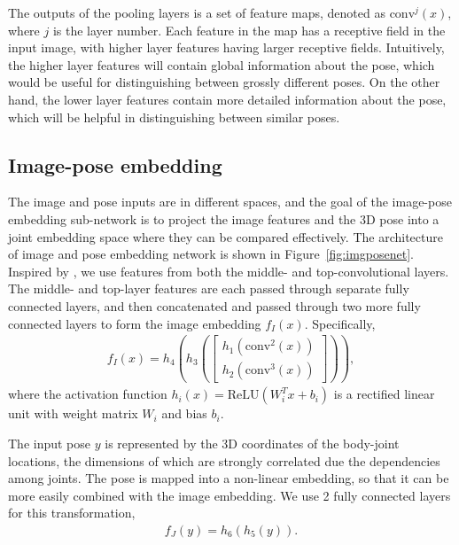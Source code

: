 \documentclass[10pt,twocolumn,letterpaper]{article}
\newcommand{\conv}{\mathrm{conv}}
\newcommand{\ReLU}{\mathrm{ReLU}}
\begin{document}
The outputs of the pooling layers is a set of feature maps, denoted as $\conv^j(x)$, where $j$ is the layer number. 
Each feature in the map has a receptive field in the input image, with higher layer features having larger receptive fields.
Intuitively, the higher layer features will contain global information about the pose, which would be useful for distinguishing between grossly different poses.
On the other hand, the lower layer features contain more detailed information about the pose, which will be helpful in distinguishing between similar poses.





\subsection{Image-pose embedding}
\label{sub:imagepose}
\vspace{-0.05in}
The image and pose inputs are in different spaces, and
the goal of the image-pose embedding sub-network is to project the image features and the 3D pose into a joint embedding space where they can be compared effectively.
The architecture of image and pose embedding network is shown in Figure~\ref{fig:imgposenet}. 
Inspired by \cite{Sun2014dlface,hmlpeijcv}, we use features from both the middle- and top-convolutional layers.
The middle- and top-layer features are each passed through separate fully connected layers, and then concatenated and passed through two more fully connected layers to form the image embedding $f_{I}(x)$.
Specifically,
\begin{align} 
f_{I}(x) = h_4 ( h_3 ( \begin{bmatrix} h_1(\conv^{2}(x)) \\ h_2(\conv^{3}(x)) \end{bmatrix})),
\label{equ:imgfeature}
\end{align} 
where the activation function $h_i(x) = \ReLU( W_i^T x + b_i)$ is a rectified linear unit with  weight matrix $W_i$ and bias $b_i$.

The input pose $y$ is represented by the 3D coordinates of the body-joint locations, 
the dimensions of which are strongly correlated due the dependencies among joints. 
The pose is mapped into a non-linear embedding, so that it can be more easily combined with the image embedding.
We use 2 fully connected layers for this transformation,
\begin{align}
f_{J}(y) = h_6( h_5(y)).
\end{align}
\end{document}
